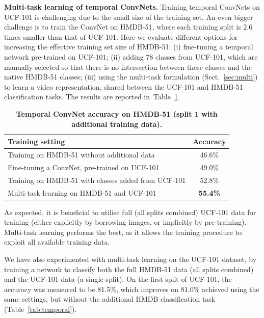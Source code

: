 \documentclass{article} %
\newcommand{\tblref}[1]{Table~\ref{#1}}
\newcommand{\sref}[1]{Sect.~\ref{#1}}
\begin{document}
\noindent\textbf{Multi-task learning of temporal ConvNets.}
Training temporal ConvNets on UCF-101 is challenging due to the small size of the training set. An even bigger challenge is to train the ConvNet on HMDB-51, where
each training split is $2.6$ times smaller than that of UCF-101. Here we evaluate different options for increasing the effective training set size of HMDB-51:
(i) fine-tuning a temporal network pre-trained on UCF-101; 
(ii) adding $78$ classes from UCF-101, which are manually selected so that there is no intersection between
these classes and the native HMDB-51 classes; 
(iii) using the multi-task formulation (\sref{sec:multi}) to learn a video representation, shared between the UCF-101 and HMDB-51 classification
tasks. The results are reported in~\tblref{tab:hmdb_extra_data}. 
\begin{table}[ht]
\small
\centering
\caption{\textbf{Temporal ConvNet accuracy on HMDB-51 (split 1 with additional training data).}
}
\begin{tabular}{|l|c|} \hline
\multicolumn{1}{|l|}{Training setting} & Accuracy \\ \hline
Training on HMDB-51 without additional data & 46.6\%  \\ \hline
Fine-tuning a ConvNet, pre-trained on UCF-101 & 49.0\%  \\ \hline
Training on HMDB-51 with classes added from UCF-101 & 52.8\% \\ \hline
Multi-task learning on HMDB-51 and UCF-101 & \textbf{55.4\%} \\ \hline
\end{tabular}
\label{tab:hmdb_extra_data}
\end{table}
As expected, it is beneficial to utilise full (all splits combined) UCF-101 data for training (either explicitly by borrowing images, or implicitly by pre-training). 
Multi-task learning performs the best, as it allows the training procedure to exploit all available training data.

We have also experimented with multi-task learning on the UCF-101 dataset, by training a network to classify both the full HMDB-51 data (all splits combined) and
the UCF-101 data (a single split). On the first split of UCF-101, the accuracy was measured to be 81.5\%,
which improves on $81.0\%$ achieved using the same settings, but without the additional HMDB classification task (\tblref{tab:temporal}).
\end{document}
